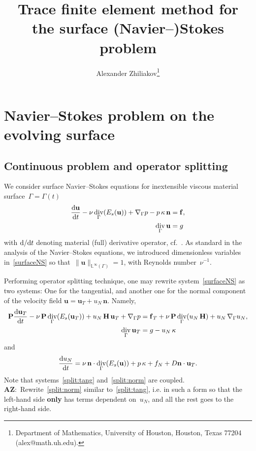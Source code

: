 \documentclass[12pt]{article}
\title{Trace finite element method for the surface (Navier--)Stokes problem}
\author{
	Alexander Zhiliakov\thanks{Department of Mathematics, University of Houston, Houston, Texas 77204 (alex@math.uh.edu).}
}
\newcommand{\vect}[1]{\boldsymbol{\mathbf{#1}}}
\DeclareMathOperator{\Div}{div}
\newcommand{\LInfSpace}[1][\Gamma]{{\mathbb L^\infty\left({#1}\right)}}
\newcommand{\AZ}[1]{{\color{red}\textbf{AZ}:~#1}}
\begin{document}
	
\maketitle

\tableofcontents
\vfill
\clearpage
\let\oldtabular\tabular
\renewcommand{\tabular}[1][1.5]{\def\arraystretch{#1}\oldtabular}

\section{Navier--Stokes problem on the evolving surface}

\subsection{Continuous problem and operator splitting}

We consider surface Navier--Stokes equations for inextensible viscous material surface~$\Gamma = \Gamma(t)$
\begin{align}\begin{split}\label{surfaceNS}
	\frac{\mbox d\vect u}{\mbox d t} - \nu\Div_\Gamma(E_s(\vect u)) + \nabla_\Gamma p - p\,\kappa\,\vect n &= \vect f,\\
	\Div_\Gamma \vect u &= g
\end{split}\end{align}
with $\mbox d / \mbox d t$ denoting material (full) derivative operator, cf.~\cite[p.~8]{Jankuhn_2018}. As standard in the analysis of the Navier--Stokes equations, we introduced dimensionless variables in~\eqref{surfaceNS} so that~$\|\vect u\|_{\LInfSpace} = 1$, with Reynolds number~$\nu^{-1}$. 

Performing operator splitting technique, one may rewrite system~\eqref{surfaceNS} as two systems: One for the tangential, and another one for the normal component of the velocity field $\vect u = \vect u_T + u_N\,\vect n$. Namely,
\begin{align}\begin{split}\label{split:tang}
	\vect P \frac{\mbox d\vect u_T}{\mbox d t} - \nu\,\vect P\Div_\Gamma(E_s(\vect u_T)) + u_N\,\vect H\,\vect u_T + \nabla_\Gamma p &= \vect f_T + \nu\,\vect P \Div_\Gamma(u_N\,\vect H) + u_N\,\nabla_\Gamma u_N,\\
	\Div_\Gamma \vect u_T &= g - u_N\,\kappa
\end{split}\end{align}
and 
\begin{equation}\label{split:norm}
	\frac{\mbox d u_N}{\mbox d t} = \nu\,\vect n\cdot\Div_\Gamma(E_s(\vect u)) + p\,\kappa + f_N + D \vect n\cdot\vect u_T. 	
\end{equation}
Note that systems~\eqref{split:tang} and~\eqref{split:norm} are coupled. \AZ{Rewrite~\eqref{split:norm} similar to~\eqref{split:tang}, i.e. in such a form so that the left-hand side \textbf{only} has terms dependent on~$u_N$, and all the rest goes to the right-hand side.}
\end{document}
